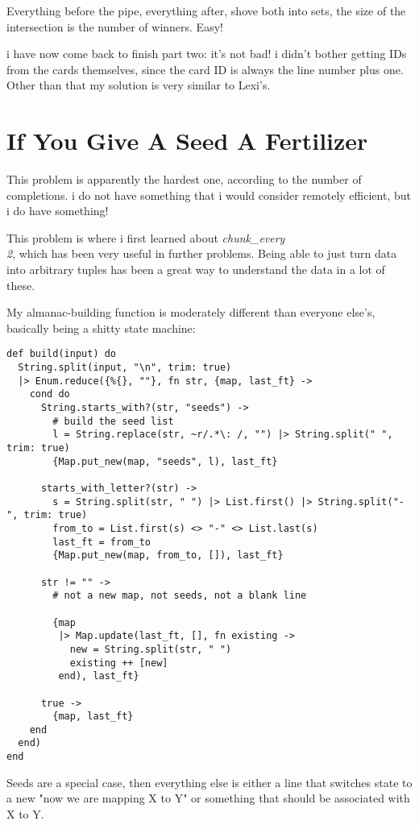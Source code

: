 \documentclass{article}
\begin{document}
Everything before the pipe, everything after, shove both into sets, the size of the intersection is the number of winners. Easy!

i have now come back to finish part two: it's not bad! i didn't bother getting IDs from the cards themselves, since the card ID is always the line number plus one. Other than that my solution is very similar to Lexi's.

\section{If You Give A Seed A Fertilizer}
This problem is apparently the hardest one, according to the number of completions. i do not have something that i would consider remotely efficient, but i do have something!

This problem is where i first learned about \textit{chunk\_every\\2}, which has been very useful in further problems. Being able to just turn data into arbitrary tuples has been a great way to understand the data in a lot of these.

My almanac-building function is moderately different than everyone else's, basically being a shitty state machine:
\begin{verbatim}
def build(input) do
  String.split(input, "\n", trim: true)
  |> Enum.reduce({%{}, ""}, fn str, {map, last_ft} ->
    cond do
      String.starts_with?(str, "seeds") ->
        # build the seed list
        l = String.replace(str, ~r/.*\: /, "") |> String.split(" ", trim: true)
        {Map.put_new(map, "seeds", l), last_ft}

      starts_with_letter?(str) ->
        s = String.split(str, " ") |> List.first() |> String.split("-", trim: true)
        from_to = List.first(s) <> "-" <> List.last(s)
        last_ft = from_to
        {Map.put_new(map, from_to, []), last_ft}

      str != "" ->
        # not a new map, not seeds, not a blank line

        {map
         |> Map.update(last_ft, [], fn existing ->
           new = String.split(str, " ")
           existing ++ [new]
         end), last_ft}

      true ->
        {map, last_ft}
    end
  end)
end
\end{verbatim}

Seeds are a special case, then everything else is either a line that switches state to a new "now we are mapping X to Y" or something that should be associated with X to Y.
\end{document}
